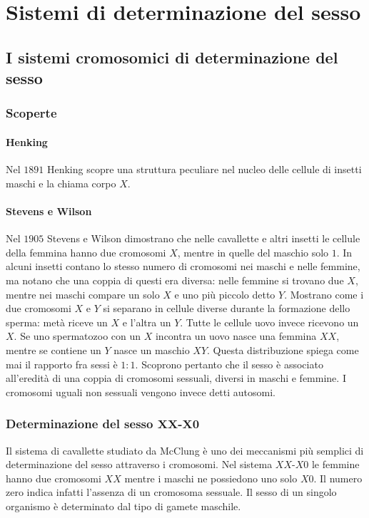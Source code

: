 \section{Sistemi di determinazione del sesso}
	
	\subsection{I sistemi cromosomici di determinazione del sesso}
	
		\subsubsection{Scoperte}

			\paragraph{Henking}
			Nel $1891$ Henking scopre una struttura peculiare nel nucleo delle cellule di insetti maschi e la chiama corpo $X$.
	
			\paragraph{Stevens e Wilson}
			Nel $1905$ Stevens e Wilson dimostrano che nelle cavallette e altri insetti le cellule della femmina hanno due cromosomi $X$, mentre in quelle del maschio solo $1$.
			In alcuni insetti contano lo stesso numero di cromosomi nei maschi e nelle femmine, ma notano che una coppia di questi era diversa: nelle femmine si trovano due $X$, mentre nei maschi compare un solo $X$ e uno pi\`u piccolo detto $Y$. 
			Mostrano come i due cromosomi $X$ e $Y$ si separano in cellule diverse durante la formazione dello sperma: met\`a riceve un $X$ e l'altra un $Y$.
			Tutte le cellule uovo invece ricevono un $X$.
			Se uno spermatozoo con un $X$ incontra un uovo nasce una femmina $XX$, mentre se contiene un $Y$ nasce un maschio $XY$.
			Questa distribuzione spiega come mai il rapporto fra sessi \`e $1:1$.
			Scoprono pertanto che il sesso \`e associato all'eredit\`a di una coppia di cromosomi sessuali, diversi in maschi e femmine.
			I cromosomi uguali non sessuali vengono invece detti autosomi.
	
		\subsubsection{Determinazione del sesso $\mathbf{XX}$-$\mathbf{X0}$}
		Il sistema di cavallette studiato da McClung \`e uno dei meccanismi pi\`u semplici di determinazione del sesso attraverso i cromosomi.
		Nel sistema $XX$-$X0$ le femmine hanno due cromosomi $XX$ mentre i maschi ne possiedono uno solo $X0$.
		Il numero zero indica infatti l'assenza di un cromosoma sessuale.
		Il sesso di un singolo organismo \`e determinato dal tipo di gamete maschile.
		
